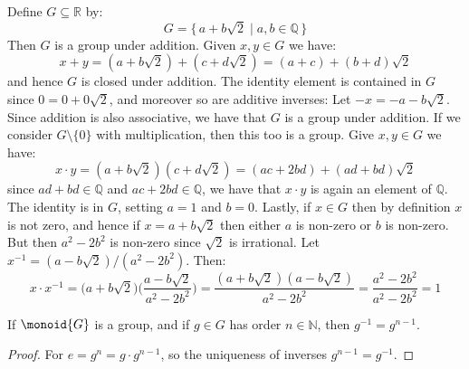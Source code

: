 \documentclass{article}                                                        %
\begin{document}
        \begin{example}
            Define $G\subseteq\mathbb{R}$ by:
            \begin{equation}
                G=\{\,a+b\sqrt{2}\;|\;a,b\in\mathbb{Q}\,\}
            \end{equation}
            Then $G$ is a group under addition. Given $x,y\in{G}$ we have:
            \begin{equation}
                x+y=(a+b\sqrt{2})+(c+d\sqrt{2})=(a+c)+(b+d)\sqrt{2}
            \end{equation}
            and hence $G$ is closed under addition. The identity element is
            contained in $G$ since $0=0+0\sqrt{2}$, and moreover so are
            additive inverses: Let $\minus{x}=\minus{a}-b\sqrt{2}$. Since
            addition is also associative, we have that $G$ is a group under
            addition. If we consider $G\setminus\{0\}$ with multiplication, then
            this too is a group. Give $x,y\in{G}$ we have:
            \begin{equation}
                x\cdot{y}=(a+b\sqrt{2})(c+d\sqrt{2})
                    =(ac+2bd)+(ad+bd)\sqrt{2}
            \end{equation}
            since $ad+bd\in\mathbb{Q}$ and $ac+2bd\in\mathbb{Q}$, we have that
            $x\cdot{y}$ is again an element of $\mathbb{Q}$. The identity is in
            $G$, setting $a=1$ and $b=0$. Lastly, if $x\in{G}$ then by
            definition $x$ is not zero, and hence if $x=a+b\sqrt{2}$ then either
            $a$ is non-zero or $b$ is non-zero. But then $a^{2}-2b^{2}$ is
            non-zero since $\sqrt{2}$ is irrational. Let
            $x^{\minus{1}}=(a-b\sqrt{2})/(a^{2}-2b^{2})$. Then:
            \begin{equation}
                x\cdot{x}^{\minus{1}}=
                \big(a+b\sqrt{2}\big)\big(\frac{a-b\sqrt{2}}{a^{2}-2b^{2}}\big)
                =\frac{(a+b\sqrt{2})(a-b\sqrt{2})}{a^{2}-2b^{2}}
                =\frac{a^{2}-2b^{2}}{a^{2}-2b^{2}}=1
            \end{equation}
        \end{example}
        \begin{theorem}
            If $\monoid{G}$ is a group, and if $g\in{G}$ has order
            $n\in\mathbb{N}$, then $g^{\minus{1}}=g^{n-1}$.
        \end{theorem}
        \begin{proof}
            For $e=g^{n}=g\cdot{g}^{n-1}$, so the uniqueness of inverses
            $g^{n-1}=g^{\minus{1}}$.
        \end{proof}
\end{document}

